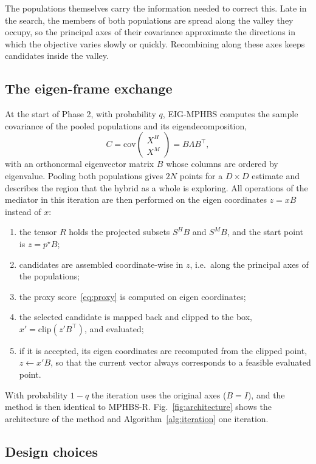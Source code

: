 \documentclass[preprint,12pt,authoryear]{elsarticle}
\theoremstyle{remark}
\begin{document}
The populations themselves carry the information needed to correct this. Late in the search, the members of both
populations are spread along the valley they occupy, so the principal axes of their covariance approximate the
directions in which the objective varies slowly or quickly. Recombining along these axes keeps candidates inside the
valley.

\subsection{The eigen-frame exchange}
At the start of Phase 2, with probability $q$, EIG-MPHBS computes the sample covariance of the pooled populations and
its eigendecomposition,
\begin{equation}
C = \mathrm{cov}\!\begin{pmatrix} X^H \\ X^M \end{pmatrix} = B\Lambda B^\top,
\label{eq:cov}
\end{equation}
with an orthonormal eigenvector matrix $B$ whose columns are ordered by eigenvalue. Pooling both populations gives
$2N$ points for a $D\times D$ estimate and describes the region that the hybrid as a whole is exploring. All operations
of the mediator in this iteration are then performed on the eigen coordinates $z=xB$ instead of $x$:
\begin{enumerate}
\item the tensor $R$ holds the projected subsets $S^HB$ and $S^MB$, and the start point is $z=p^\star B$;
\item candidates are assembled coordinate-wise in $z$, i.e.\ along the principal axes of the populations;
\item the proxy score~\eqref{eq:proxy} is computed on eigen coordinates;
\item the selected candidate is mapped back and clipped to the box, $x'=\mathrm{clip}(z'B^\top)$, and evaluated;
\item if it is accepted, its eigen coordinates are recomputed from the clipped point, $z\leftarrow x'B$, so that the
current vector always corresponds to a feasible evaluated point.
\end{enumerate}
With probability $1-q$ the iteration uses the original axes ($B=I$), and the method is then identical to MPHBS-R.
Fig.~\ref{fig:architecture} shows the architecture of the method and Algorithm~\ref{alg:iteration} one iteration.

\subsection{Design choices}
\end{document}
